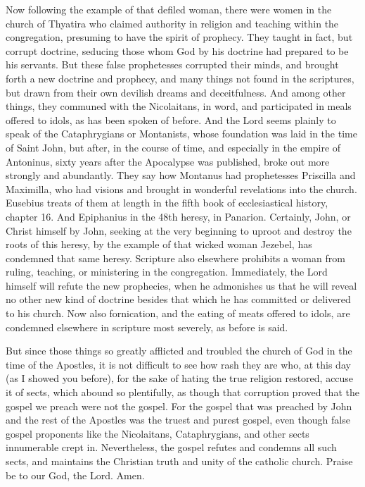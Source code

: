 Now following the example of that defiled woman, there were women in the church of Thyatira who claimed authority in religion and teaching within the congregation, presuming to have the spirit of prophecy. They taught in fact, but corrupt doctrine, seducing those whom God by his doctrine had prepared to be his servants. But these false prophetesses corrupted their minds, and brought forth a new doctrine and prophecy, and many things not found in the scriptures, but drawn from their own devilish dreams and deceitfulness. And among other things, they communed with the Nicolaitans, in word, and participated in meals offered to idols, as has been spoken of before. And the Lord seems plainly to speak of the Cataphrygians or Montanists, whose foundation was laid in the time of Saint John, but after, in the course of time, and especially in the empire of Antoninus, sixty years after the Apocalypse was published, broke out more strongly and abundantly. They say how Montanus had prophetesses Priscilla and Maximilla, who had visions and brought in wonderful revelations into the church. Eusebius treats of them at length in the fifth book of ecclesiastical history, chapter 16. And Epiphanius in the 48th heresy, in Panarion. Certainly, John, or Christ himself by John, seeking at the very beginning to uproot and destroy the roots of this heresy, by the example of that wicked woman Jezebel, has condemned that same heresy. Scripture also elsewhere prohibits a woman from ruling, teaching, or ministering in the congregation. Immediately, the Lord himself will refute the new prophecies, when he admonishes us that he will reveal no other new kind of doctrine besides that which he has committed or delivered to his church. Now also fornication, and the eating of meats offered to idols, are condemned elsewhere in scripture most severely, as before is said.

But since those things so greatly afflicted and troubled the church of God in the time of the Apostles, it is not difficult to see how rash they are who, at this day (as I showed you before), for the sake of hating the true religion restored, accuse it of sects, which abound so plentifully, as though that corruption proved that the gospel we preach were not the gospel. For the gospel that was preached by John and the rest of the Apostles was the truest and purest gospel, even though false gospel proponents like the Nicolaitans, Cataphrygians, and other sects innumerable crept in. Nevertheless, the gospel refutes and condemns all such sects, and maintains the Christian truth and unity of the catholic church. Praise be to our God, the Lord. Amen.
